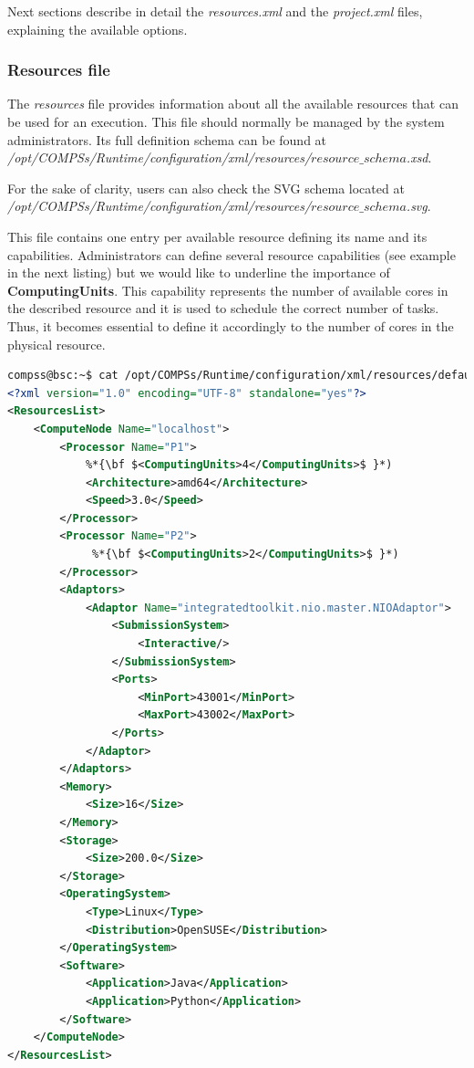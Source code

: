 Next sections describe in detail the \textit{resources.xml} and the \textit{project.xml} files, 
explaining the available options.

\subsubsection{Resources file}
The \textit{resources} file provides information about all the available resources that can be used for an execution. 
This file should normally be managed by the system administrators. Its full definition schema can be found at \\
\emph{/opt/COMPSs/Runtime/configuration/xml/resources/$resource\_schema$.xsd}. 

For the sake of clarity, users can also check the SVG schema located at \\
\emph{/opt/COMPSs/Runtime/configuration/xml/resources/$resource\_schema$.svg}.

This file contains one entry per available resource defining its name and its capabilities. Administrators can define several
resource capabilities (see example in the next listing) but we would like to underline the importance of 
\textbf{ComputingUnits}. This capability represents the number of available cores in the described resource and it is
used to schedule the correct number of tasks. Thus, it becomes essential to define it accordingly to the number of cores 
in the physical resource. 

\begin{lstlisting}[language=xml]
compss@bsc:~$ cat /opt/COMPSs/Runtime/configuration/xml/resources/default_resources.xml
<?xml version="1.0" encoding="UTF-8" standalone="yes"?>
<ResourcesList>
    <ComputeNode Name="localhost">
        <Processor Name="P1">
            %*{\bf $<ComputingUnits>4</ComputingUnits>$ }*)
            <Architecture>amd64</Architecture>
            <Speed>3.0</Speed>
        </Processor>
        <Processor Name="P2">
             %*{\bf $<ComputingUnits>2</ComputingUnits>$ }*)
        </Processor>
        <Adaptors>
            <Adaptor Name="integratedtoolkit.nio.master.NIOAdaptor">
                <SubmissionSystem>
                    <Interactive/>
                </SubmissionSystem>
                <Ports>
                    <MinPort>43001</MinPort>
                    <MaxPort>43002</MaxPort>
                </Ports>
            </Adaptor>
        </Adaptors>
        <Memory>
            <Size>16</Size>
        </Memory>
        <Storage>
            <Size>200.0</Size>
        </Storage>
        <OperatingSystem>
            <Type>Linux</Type>
            <Distribution>OpenSUSE</Distribution>
        </OperatingSystem>
        <Software>
            <Application>Java</Application>
            <Application>Python</Application>
        </Software>
    </ComputeNode>
</ResourcesList>
\end{lstlisting}


